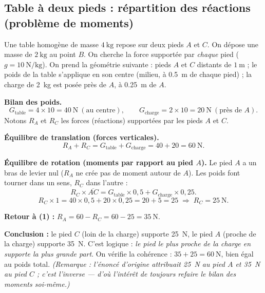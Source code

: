 \documentclass[11pt,a4paper]{article}
\begin{document}
\subsection{Table à deux pieds : répartition des réactions (problème de moments)}
\begin{exemple}
Une table homogène de masse $\SI{4}{\kilogram}$ repose sur deux pieds $A$ et $C$. On dépose une
masse de $\SI{2}{\kilogram}$ au point $B$. On cherche la force supportée par \emph{chaque} pied
($g=\SI{10}{\newton\per\kilogram}$). On prend la géométrie suivante : pieds $A$ et $C$ distants de
$\SI{1}{\metre}$ ; le poids de la table s'applique en son centre (milieu, à \SI{0.5}{\metre} de chaque
pied) ; la charge de \SI{2}{\kilogram} est posée près de $A$, à \SI{0.25}{\metre} de $A$.

\smallskip
\textbf{Bilan des poids.}
\[
G_{\text{table}} = 4\times 10 = \SI{40}{\newton}\ (\text{au centre}),\qquad
G_{\text{charge}} = 2\times 10 = \SI{20}{\newton}\ (\text{près de } A).
\]
Notons $R_A$ et $R_C$ les forces (réactions) supportées par les pieds $A$ et $C$.

\textbf{Équilibre de translation (forces verticales).}
\[
R_A + R_C = G_{\text{table}} + G_{\text{charge}} = 40 + 20 = \SI{60}{\newton}. \tag{1}
\]

\textbf{Équilibre de rotation (moments par rapport au pied $A$).} Le pied $A$ a un bras de levier nul
($R_A$ ne crée pas de moment autour de $A$). Les poids font tourner dans un sens, $R_C$ dans
l'autre :
\[
R_C \times \overline{AC} = G_{\text{table}}\times 0{,}5 + G_{\text{charge}}\times 0{,}25 .
\]
\[
R_C \times 1 = 40\times 0{,}5 + 20\times 0{,}25 = 20 + 5 = 25
\;\Longrightarrow\; R_C = \SI{25}{\newton}.
\]

\textbf{Retour à (1) :} $R_A = 60 - R_C = 60 - 25 = \SI{35}{\newton}$.

\smallskip
\textbf{Conclusion :} le pied $C$ (loin de la charge) supporte \SI{25}{\newton}, le pied $A$ (proche de
la charge) supporte \SI{35}{\newton}. C'est logique : \emph{le pied le plus proche de la charge en
supporte la plus grande part}. On vérifie la cohérence : $35 + 25 = \SI{60}{\newton}$, bien égal au
poids total. \emph{(Remarque : l'énoncé d'origine attribuait \SI{25}{\newton} au pied $A$ et
\SI{35}{\newton} au pied $C$ ; c'est l'inverse — d'où l'intérêt de toujours refaire le bilan des
moments soi-même.)}
\end{exemple}

\end{document}
